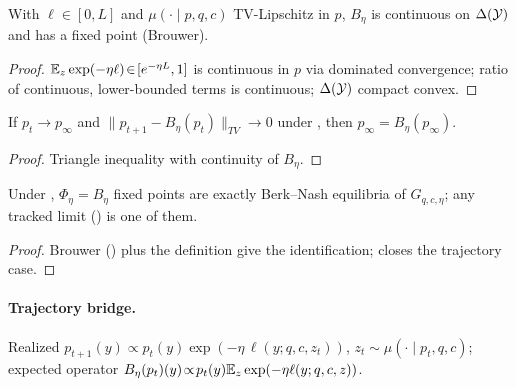 \begin{lemma}
\label{lem:phi-continuous}
With $\ell\!\in\![0,L]$ and $\mu(\cdot\mid p,q,c)$ TV-Lipschitz in
$p$, $B_\eta$ is continuous on $\Delta(\mathcal{Y})$ and has a fixed point
(Brouwer).
\end{lemma}

\begin{proof}
$\mathbb{E}_z\exp(-\eta\ell)\!\in\![e^{-\eta L},1]$ is continuous in $p$ via
dominated convergence; ratio of continuous, lower-bounded terms is
continuous; $\Delta(\mathcal{Y})$ compact convex.
\end{proof}

\begin{lemma}
\label{lem:bn-limit}
If $p_t\!\to\!p_\infty$ and $\|p_{t+1}\!-\!B_\eta(p_t)\|_{TV}\!\to\!0$
under , then $p_\infty\!=\!B_\eta(p_\infty)$.
\end{lemma}

\begin{proof}
Triangle inequality with continuity of $B_\eta$.
\end{proof}

\begin{proposition}[$\Phi_\eta$ fixed points $=$ Berk--Nash equilibria]
\label{prop:berk-nash-reduction}
Under , $\Phi_\eta\!=\!B_\eta$ fixed points
are exactly Berk--Nash equilibria of $G_{q,c,\eta}$; any tracked
limit () is one of them.
\end{proposition}

\begin{proof}
Brouwer () plus the definition give the
identification;  closes the trajectory case.
\end{proof}

\paragraph{Trajectory bridge.}
\label{app:thm3-tracking-honest}
Realized $p_{t+1}(y)\!\propto\!p_t(y)\exp(-\eta\,\ell(y;q,c,z_t))$,
$z_t\!\sim\!\mu(\cdot\!\mid\!p_t,q,c)$; expected operator
$B_\eta(p_t)(y)\!\propto\!p_t(y)\mathbb{E}_z\exp(-\eta\ell(y;q,c,z))$.

